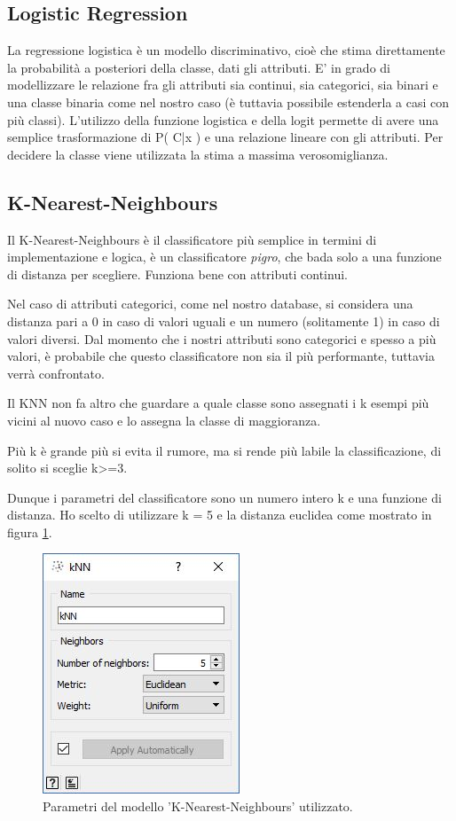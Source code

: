 \documentclass[a4paper, 12p]{report}
\begin{document}
	\subsection{Logistic Regression}
	La regressione logistica è un modello discriminativo, cioè che stima direttamente la probabilità a posteriori della classe, dati gli attributi. E' in grado di modellizzare le relazione fra gli attributi sia continui, sia categorici, sia binari e una classe binaria come nel nostro caso (è tuttavia possibile estenderla a casi con più classi). L'utilizzo della funzione logistica e della logit permette di avere una semplice trasformazione di P( C|x ) e una relazione lineare con gli attributi. Per decidere la classe viene utilizzata la stima a massima verosomiglianza.

	\subsection{K-Nearest-Neighbours}
	Il K-Nearest-Neighbours è il classificatore più semplice in termini di implementazione e logica, è un classificatore \emph{pigro}, che bada solo a una funzione di distanza per scegliere. Funziona bene con attributi continui. 
	
	Nel caso di attributi categorici, come nel nostro database, si considera una distanza pari a 0 in caso di valori uguali e un numero (solitamente 1) in caso di valori diversi. Dal momento che i nostri attributi sono categorici e spesso a più valori, è probabile che questo classificatore non sia il più performante, tuttavia verrà confrontato.
	
	
Il KNN non fa altro che guardare a quale classe sono assegnati i k esempi più vicini al nuovo caso e lo assegna la classe di maggioranza. 

Più k è grande più si evita il rumore, ma si rende più labile la classificazione, di solito si sceglie k>=3. 

Dunque i parametri del classificatore sono un numero intero k e una funzione di distanza. Ho scelto di utilizzare k = 5 e la distanza euclidea come mostrato in figura \ref{fig:7}.
\begin{figure}	
	\centering
	\includegraphics[scale = 0.8]{img/Knn.JPG}
	\caption{Parametri del modello 'K-Nearest-Neighbours' utilizzato.}\label{fig:7}
\end{figure}	
\end{document}
